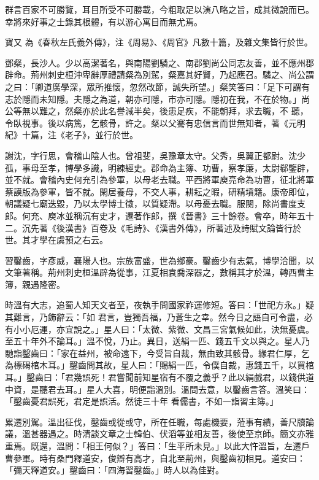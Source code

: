 \begin{pinyinscope}
 群言百家不可勝覽，耳目所受不可勝載，今粗取足以演八略之旨，成其微說而已。幸將來好事之士錄其根體，有以游心寓目而無尤焉。



 寶又
 為《春秋左氏義外傳》，注《周易》、《周官》凡數十篇，及雜文集皆行於世。



 鄧粲，長沙人。少以高潔著名，與南陽劉驎之、南郡劉尚公同志友善，並不應州郡辟命。荊州刺史桓沖卑辭厚禮請粲為別駕，粲嘉其好賢，乃起應召。驎之、尚公謂之曰：「卿道廣學深，眾所推懷，忽然改節，誠失所望。」粲笑答曰：「足下可謂有志於隱而未知隱。夫隱之為道，朝亦可隱，市亦可隱。隱初在我，不在於物。」尚公等無以難之，然粲亦於此名譽減半矣，後患足疾，不能朝拜，求去職，不
 聽，令臥視事。後以病篤，乞骸骨，許之。粲以父騫有忠信言而世無知者，著《元明紀》十篇，注《老子》，並行於世。



 謝沈，字行思，會稽山陰人也。曾祖斐，吳豫章太守。父秀，吳翼正都尉。沈少孤，事母至孝，博學多識，明練經史。郡命為主簿、功曹，察孝廉，太尉郗鑒辟，並不就。會稽內史何充引為參軍，以母老去職。平西將軍庾亮命為功曹，征北將軍蔡謨版為參軍，皆不就。閑居養母，不交人事，耕耘之暇，研精墳籍。康帝即位，朝議疑七廟迭毀，乃以太學博士徵，以質疑滯。以母憂去職。服闋，除尚書度支
 郎。何充、庾冰並稱沉有史才，遷著作郎，撰《晉書》三十餘卷。會卒，時年五十二。沉先著《後漢書》百卷及《毛詩》、《漢書外傳》，所著述及詩賦文論皆行於世。其才學在虞預之右云。



 習鑿齒，字彥威，襄陽人也。宗族富盛，世為鄉豪。鑿齒少有志氣，博學洽聞，以文筆著稱。荊州刺史桓溫辟為從事，江夏相袁喬深器之，數稱其才於溫，轉西曹主簿，親遇隆密。



 時溫有大志，追蜀人知天文者至，夜執手問國家祚運修短。答曰：「世祀方永。」疑其難言，乃飾辭云：「如
 君言，豈獨吾福，乃蒼生之幸。然今日之語自可令盡，必有小小厄運，亦宜說之。」星人曰：「太微、紫微、文昌三宮氣候如此，決無憂虞。至五十年外不論耳。」溫不悅，乃止。異日，送絹一匹、錢五千文以與之。星人乃馳詣鑿齒曰：「家在益州，被命遠下，今受旨自裁，無由致其骸骨。緣君仁厚，乞為標碣棺木耳。」鑿齒問其故，星人曰：「賜絹一匹，令僕自裁，惠錢五千，以買棺耳。」鑿齒曰：「君幾誤死！君嘗聞前知星宿有不覆之義乎？此以絹戲君，以錢供道中資，是聽君去耳。」星人大喜，明便詣溫別。溫問去意，以鑿齒言答。溫笑曰：「鑿齒憂君誤死，君定是誤活。然徒三十年
 看儒書，不如一詣習主簿。」



 累遷別駕。溫出征伐，鑿齒或從或守，所在任職，每處機要，蒞事有績，善尺牘論議，溫甚器遇之。時清談文章之士韓伯、伏滔等並相友善，後使至京師。簡文亦雅重焉。既還，溫問：「相王何似？」答曰：「生平所未見。」以此大忤溫旨，左遷戶曹參軍。時有桑門釋道安，俊辯有高才，自北至荊州，與鑿齒初相見。道安曰：「彌天釋道安。」鑿齒曰：「四海習鑿齒。」時人以為佳對。




\end{pinyinscope}
